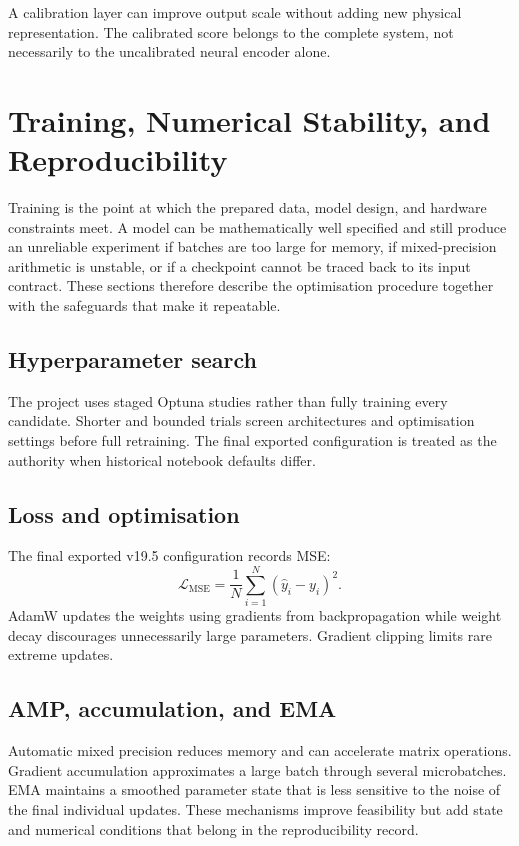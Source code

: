 \documentclass[12pt,a4paper]{report}
\newcommand{\feat}[1]{#1\par}
\begin{document}
\feat{A calibration layer can improve output scale without adding new
physical representation. The calibrated score belongs to the complete system,
not necessarily to the uncalibrated neural encoder alone.}

\section{Training, Numerical Stability, and Reproducibility}

Training is the point at which the prepared data, model design, and hardware
constraints meet. A model can be mathematically well specified and still
produce an unreliable experiment if batches are too large for memory, if
mixed-precision arithmetic is unstable, or if a checkpoint cannot be traced
back to its input contract. These sections therefore describe the optimisation
procedure together with the safeguards that make it repeatable.

\subsection{Hyperparameter search}
The project uses staged Optuna studies rather than fully training every
candidate. Shorter and bounded trials screen architectures and optimisation
settings before full retraining. The final exported configuration is treated as
the authority when historical notebook defaults differ.

\subsection{Loss and optimisation}
The final exported v19.5 configuration records MSE:
\[
\mathcal{L}_{\mathrm{MSE}}=\frac{1}{N}\sum_{i=1}^{N}
(\hat{y}_i-y_i)^2.
\]
AdamW updates the weights using gradients from backpropagation while weight
decay discourages unnecessarily large parameters. Gradient clipping limits
rare extreme updates.

\subsection{AMP, accumulation, and EMA}
Automatic mixed precision reduces memory and can accelerate matrix operations.
Gradient accumulation approximates a large batch through several microbatches.
EMA maintains a smoothed parameter state that is less sensitive to the noise of
the final individual updates. These mechanisms improve feasibility but add
state and numerical conditions that belong in the reproducibility record.
\end{document}
